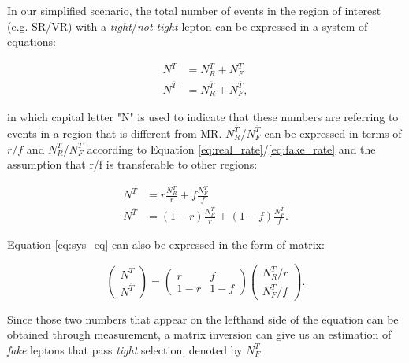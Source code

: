 In our simplified scenario, the total number of events in the region of interest (e.g. SR/VR) with a \emph{tight}/\emph{not tight} lepton can be expressed in a system of equations:

\begin{equation}
\begin{split}
N^{T}&=N_{R}^{T}+N_{F}^{T}\\
N^{\overline{T}}&=N_{R}^{\overline{T}}+N_{F}^{\overline{T}},
\end{split}
\end{equation}

in which capital letter "N" is used to indicate that these numbers are referring to events in a region that is different from MR. $N_{R}^{\overline{T}}$/$N_{F}^{\overline{T}}$ can be expressed in terms of $r/f$ and $N_{R}^{T}$/$N_{F}^{T}$ according to Equation \ref{eq:real_rate}/\ref{eq:fake_rate} and the assumption that r/f is transferable to other regions:

\begin{equation}
\begin{split}
N^{T}&=r\frac{N_{R}^{T}}{r}+f\frac{N_{F}^{T}}{f}\\
N^{\overline{T}}&=(1-r)\frac{N_{R}^{T}}{r}+(1-f)\frac{N_{F}^{T}}{f}.
\end{split}
\label{eq:sys_eq}
\end{equation}

Equation \ref{eq:sys_eq} can also be expressed in the form of matrix:

\begin{equation}
 \begin{pmatrix}
 N^{T}\\
 N^{\overline{T}}
 \end{pmatrix}=\begin{pmatrix}
r&f\\
1-r&1-f
 \end{pmatrix}\begin{pmatrix}
 N_{R}^{T}/r\\
 N_{F}^{T}/f
 \end{pmatrix}.
 \label{eq:matrix}
 \end{equation}
 
Since those two numbers that appear on the lefthand side of the equation can be obtained through measurement, a matrix inversion can give us an estimation of \emph{fake} leptons that pass \emph{tight} selection, denoted by $N_{F}^T$.

